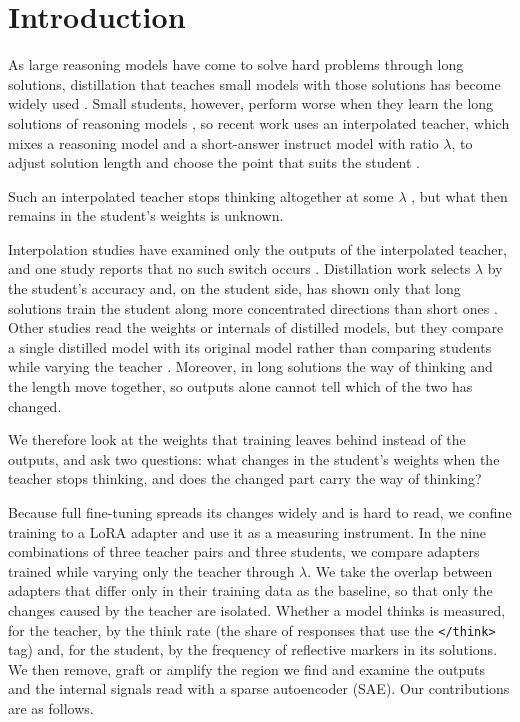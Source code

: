 \section{Introduction}
\label{sec:intro}

As large reasoning models have come to solve hard problems through long solutions, distillation that teaches small models with those solutions has become widely used \citep{guo2025deepseekr1,muennighoff2025s1}. Small students, however, perform worse when they learn the long solutions of reasoning models \citep{li2025small,luo2025valley}, so recent work uses an interpolated teacher, which mixes a reasoning model and a short-answer instruct model with ratio $\lambda$, to adjust solution length and choose the point that suits the student \citep{lan2026midistillation}.

Such an interpolated teacher stops thinking altogether at some $\lambda$ \citep{wu2026interpolation,lan2025spectrum}, but what then remains in the student's weights is unknown.

Interpolation studies have examined only the outputs of the interpolated teacher, and one study reports that no such switch occurs \citep{yang2026system}. Distillation work selects $\lambda$ by the student's accuracy and, on the student side, has shown only that long solutions train the student along more concentrated directions than short ones \citep{lan2026midistillation}. Other studies read the weights or internals of distilled models, but they compare a single distilled model with its original model rather than comparing students while varying the teacher \citep{ward2025rank1,hu2026transcoder,venhoff2026base}. Moreover, in long solutions the way of thinking and the length move together, so outputs alone cannot tell which of the two has changed.

We therefore look at the weights that training leaves behind instead of the outputs, and ask two questions: what changes in the student's weights when the teacher stops thinking, and does the changed part carry the way of thinking?

Because full fine-tuning spreads its changes widely and is hard to read, we confine training to a LoRA adapter and use it as a measuring instrument. In the nine combinations of three teacher pairs and three students, we compare adapters trained while varying only the teacher through $\lambda$. We take the overlap between adapters that differ only in their training data as the baseline, so that only the changes caused by the teacher are isolated. Whether a model thinks is measured, for the teacher, by the think rate (the share of responses that use the \texttt{</think>} tag) and, for the student, by the frequency of reflective markers in its solutions. We then remove, graft or amplify the region we find and examine the outputs and the internal signals read with a sparse autoencoder (SAE). Our contributions are as follows.

